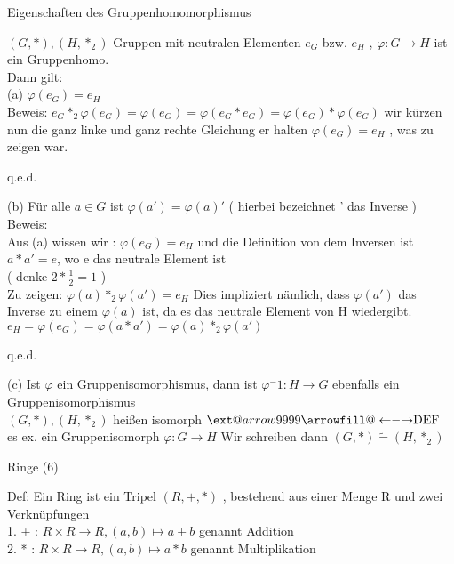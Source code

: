 \documentclass[headsepline,12pt,a4paper]{scrartcl}
\makeatletter
\newcommand\xleftrightarrow[2][]{%
  \ext@arrow 9999{\longleftrightarrowfill@}{#1}{#2}}
\newcommand\longleftrightarrowfill@{%
  \arrowfill@\leftarrow\relbar\rightarrow}
\makeatother
\begin{document}
\begin{center}
\item[Eigenschaften des Gruppenhomomorphismus]
\end{center}
\item $(G,*), (H, *_2) $ Gruppen mit neutralen Elementen $e_G$ bzw. $e_H$ , $ \varphi: G \rightarrow H $ ist ein Gruppenhomo. \\
Dann gilt: \\
(a) $\varphi(e_G)=e_H$ \\
Beweis: $ e_G *_2 \varphi(e_G) = \varphi(e_G) = \varphi(e_G * e_G) = \varphi(e_G) * \varphi(e_G) $ wir kürzen nun die ganz linke und ganz rechte Gleichung er halten $\varphi(e_G)=e_H$ , was zu zeigen war. 
\begin{flushright}
q.e.d.
\end{flushright}
(b) Für alle $ a \in G $ ist $ \varphi(a') = \varphi (a)' $ ( hierbei bezeichnet ' das Inverse )\\
Beweis: \\

Aus (a) wissen wir : $\varphi(e_G)=e_H$ und die Definition von dem Inversen ist $ a * a' = e $, wo e das neutrale Element ist \\
( denke $ 2 * \frac{1}{2} = 1 $ ) \\
Zu zeigen: $\varphi(a) *_2 \varphi(a') = e_H $ Dies impliziert nämlich, dass $\varphi(a')$ das Inverse zu einem $\varphi(a)$ ist, da es das neutrale Element von H wiedergibt. \\
$e_H=\varphi(e_G) = \varphi(a*a') = \varphi(a) *_2 \varphi(a') $ 
\begin{flushright}
q.e.d. \\
\end{flushright}

(c) Ist $\varphi$ ein Gruppenisomorphismus, dann ist $\varphi ^-1 : H \rightarrow G $ ebenfalls ein Gruppenisomorphismus \\
$(G,*), (H, *_2) $ heißen isomorph $ \xleftrightarrow{\text{DEF}} $ es ex. ein Gruppenisomorph
 $ \varphi : G \rightarrow H $ Wir schreiben dann $(G,*) \tilde{=} (H,*_2) $

\begin{center}
\item[Ringe (6) ]
\end{center}
\item Def: Ein Ring ist ein Tripel $(R,+,*)$ , bestehend aus einer Menge R und zwei Verknüpfungen \\
1. + : $ R \times R \rightarrow R , (a,b) \mapsto a+b $ genannt Addition \\
2. * : $ R \times R \rightarrow R , (a,b) \mapsto a*b $ genannt Multiplikation \\
\end{document}
